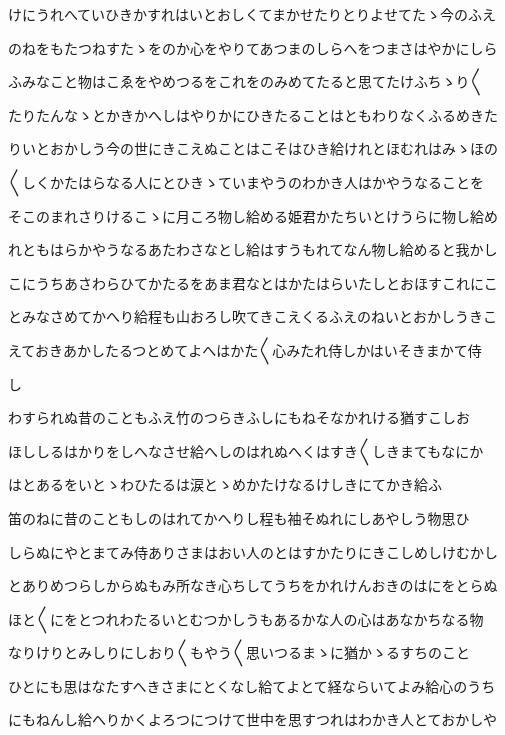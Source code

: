 \documentclass[a4paper,11pt,landscape]{ltjtarticle}
\begin{document}
\par\medskip
けにうれへていひきかすれはいとおしくてまかせたりとりよせてたゝ今のふえ
\par\medskip
のねをもたつねすたゝをのか心をやりてあつまのしらへをつまさはやかにしら
\par\medskip
ふみなこと物はこゑをやめつるをこれをのみめてたると思てたけふちゝり〱
\par\medskip
たりたんなゝとかきかへしはやりかにひきたることはともわりなくふるめきた
\par\medskip
りいとおかしう今の世にきこえぬことはこそはひき給けれとほむれはみゝほの
\par\medskip
〱しくかたはらなる人にとひきゝていまやうのわかき人はかやうなることを
\par\medskip
そこのまれさりけるこゝに月ころ物し給める姫君かたちいとけうらに物し給め
\par\medskip
れともはらかやうなるあたわさなとし給はすうもれてなん物し給めると我かし
\par\medskip
こにうちあさわらひてかたるをあま君なとはかたはらいたしとおほすこれにこ
\par\medskip
とみなさめてかへり給程も山おろし吹てきこえくるふえのねいとおかしうきこ
\par\medskip
えておきあかしたるつとめてよへはかた〱心みたれ侍しかはいそきまかて侍
\par\medskip
し
\par\medskip
わすられぬ昔のこともふえ竹のつらきふしにもねそなかれける猶すこしお
\par\medskip
ほししるはかりをしへなさせ給へしのはれぬへくはすき〱しきまてもなにか
\par\medskip
はとあるをいとゝわひたるは涙とゝめかたけなるけしきにてかき給ふ
\par\medskip
笛のねに昔のこともしのはれてかへりし程も袖そぬれにしあやしう物思ひ
\par\medskip
しらぬにやとまてみ侍ありさまはおい人のとはすかたりにきこしめしけむかし
\par\medskip
とありめつらしからぬもみ所なき心ちしてうちをかれけんおきのはにをとらぬ
\par\medskip
ほと〱にをとつれわたるいとむつかしうもあるかな人の心はあなかちなる物
\par\medskip
なりけりとみしりにしおり〱もやう〱思いつるまゝに猶かゝるすちのこと
\par\medskip
ひとにも思はなたすへきさまにとくなし給てよとて経ならいてよみ給心のうち
\par\medskip
にもねんし給へりかくよろつにつけて世中を思すつれはわかき人とておかしや
\end{document}
